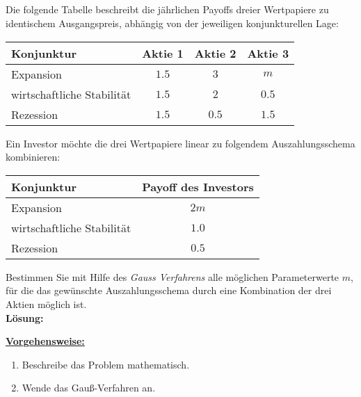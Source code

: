 \subsection*{}
Die folgende Tabelle beschreibt die jährlichen Payoffs dreier Wertpapiere zu identischem Ausgangspreis, abhängig von der jeweiligen konjunkturellen Lage:
\begin{table}[H]
	\centering
	\begin{tabular}{l c c c}
		\hline
		Konjunktur & Aktie 1  &  Aktie 2 &  Aktie 3 \\ \hline
		Expansion & $ 1.5 $ & $ 3 $ & $ m $  \\ 
		wirtschaftliche Stabilität & $ 1.5 $ & $ 2 $ & $ 0.5 $ \\ 
		Rezession & $ 1.5 $ & $ 0.5 $ & $ 1.5 $  \\ \hline
	\end{tabular}%
	
\end{table}
Ein Investor möchte die drei Wertpapiere linear zu folgendem Auszahlungsschema kombinieren:
\begin{table}[H]
	\centering
	\begin{tabular}{l c }
		\hline
		Konjunktur & Payoff des Investors \\ \hline
		Expansion & $ 2m $  \\ 
		wirtschaftliche Stabilität & $ 1.0 $  \\ 
		Rezession & $ 0.5 $   \\ \hline
	\end{tabular}%
	
\end{table}
Bestimmen Sie mit Hilfe des \textit{Gauss Verfahrens} alle möglichen Parameterwerte $ m $, für die das gewünschte Auszahlungsschema durch eine Kombination der drei Aktien möglich ist.\\

\textbf{Lösung:}
\begin{mdframed}
\underline{\textbf{Vorgehensweise:}}
\renewcommand{\labelenumi}{\theenumi.}
\begin{enumerate}
\item Beschreibe das Problem mathematisch.
\item Wende das Gauß-Verfahren an.
\end{enumerate}
\end{mdframed}

